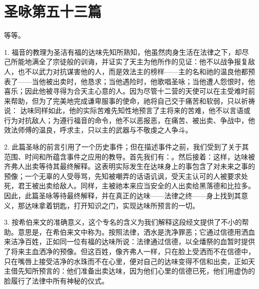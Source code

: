 

\section{圣咏第五十三篇}

\par

等等。\par

1. 福音的教理为圣洁有福的达味先知所熟知，他虽然肉身生活在法律之下，却尽己所能地满全了宗徒般的训诲，并证实了天主为他所作的见证：\newline{}他不以战争报复敌人，也不以武力对抗谋害他的人，而是效法主的榜样——主的名和祂的温良他都预表了——当他被出卖时，他恳求；当他遇险时，他歌唱圣咏；当他遭人怨恨时，他喜乐；因此他被寻得为合天主心意的人。因为尽管十二营的天使可以在主受难时前来帮助，但为了完美地完成谦卑服事的使命，祂将自己交于痛苦和软弱，只以祈祷说： 达味同样如此，他的实际苦难先知性地预言了主将来的苦难，他不以言语或行为对抗敌人；为遵行福音的命令，他不以恶报恶，在痛苦、被出卖、争战中，他效法师傅的温良，呼求主，只以主的武器与不敬虔之人争斗。\par

2. 此篇圣咏的前言引用了一个历史事件；但在描述事件之前，我们受到了关于其范围、时间和所蕴含事件之应用的教导。首先我们有：。然后接着：这样，达味被齐弗人出卖等待其最终解释。这表明实际发生在达味身上的事包含了对未来之事的预像；一个无辜的人受辱骂，先知被嘲弄的话语讥讽，受天主认可的人被要求处死，君王被出卖给敌人。同样，主被祂本来应当安全的人出卖给黑落德和比拉多。因此，此篇圣咏等待最终解释，并在真正的达味——法律之终——身上找到其意义，那达味拿着钥匙，打开知识之门，实现达味所预言的一切。\par

3. 按希伯来文的准确意义，这个专名的含义为我们解释这段经文提供了不小的帮助。意思是，在希伯来文中称为。按照法律，洒水是洗净罪恶；它通过信德用洒血来洁净百姓，正如同一位有福的达味所说：法律通过信德，以全燔祭的血暂时提供了将来主血洒净的预像。但这百姓，像齐弗人一样，只在脸上受洒而不在信德中，只在嘴唇上接受洁净的水珠而不在心里，便对自己的达味变得不信和出卖，正如天主借先知所预言的：他们准备出卖达味，因为他们心里的信德已死，他们用虚伪的脸履行了法律中所有神秘的仪式。\par

